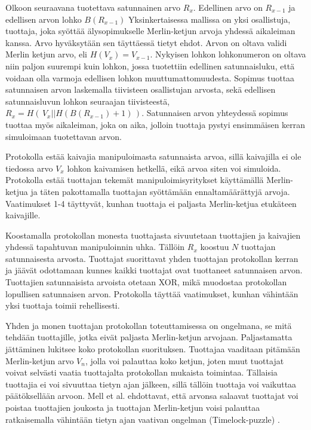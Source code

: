 Olkoon seuraavana tuotettava satunnainen arvo $R_x$. Edellinen arvo on $R_{x-1}$ ja edellisen arvon lohko $B(R_{x-1})$
Yksinkertaisessa mallissa on yksi osallistuja, tuottaja, joka syöttää älysopimukselle Merlin-ketjun arvoja yhdessä aikaleiman kanssa. Arvo hyväksytään sen täyttäessä tietyt ehdot. Arvon on oltava validi Merlin ketjun arvo, eli $H(V_x) = V_{x-1}$. Nykyisen lohkon lohkonumeron on oltava niin paljon suurempi kuin lohkon, jossa tuotettiin edellinen satunnaisluku, että voidaan olla varmoja edellisen lohkon muuttumattomuudesta. Sopimus tuottaa satunnaisen arvon laskemalla tiivisteen osallistujan arvosta, sekä edellisen satunnaisluvun lohkon seuraajan tiivisteestä, $R_x = H(\, V_x || H(B(R_{x-1})+1) \,)$. Satunnaisen arvon yhteydessä sopimus tuottaa myös aikaleiman, joka on aika, jolloin tuottaja pystyi ensimmäisen kerran simuloimaan tuotettavan arvon. 

Protokolla estää kaivajia manipuloimasta satunnaista arvoa, sillä kaivajilla ei ole tiedossa arvo $V_x$ lohkon kaivamisen hetkellä, eikä arvoa siten voi simuloida. Protokolla estää tuottajan tekemät manipuloimisyritykset käyttämällä Merlin-ketjua ja täten pakottamalla tuottajan syöttämään ennaltamäärättyjä arvoja. Vaatimukset 1-4 täyttyvät, kunhan tuottaja ei paljasta Merlin-ketjua etukäteen kaivajille. 

Koostamalla protokollan monesta tuottajasta sivuutetaan tuottajien ja kaivajien yhdessä tapahtuvan manipuloinnin uhka. Tällöin $R_x$ koostuu $N$ tuottajan satunnaisesta arvosta. Tuottajat suorittavat yhden tuottajan protokollan kerran ja jäävät odottamaan kunnes kaikki tuottajat ovat tuottaneet satunnaisen arvon. Tuottajien satunnaisista arvoista otetaan XOR, mikä muodostaa protokollan lopullisen satunnaisen arvon. Protokolla täyttää vaatimukset, kunhan vähintään yksi tuottaja toimii rehellisesti.

Yhden ja monen tuottajan protokollan toteuttamisessa on ongelmana, se mitä tehdään tuottajille, jotka eivät paljasta Merlin-ketjun arvojaan. Paljastamatta jättäminen lukitsee koko protokollan suorituksen. Tuottajaa vaaditaan pitämään Merlin-ketjun arvo $V_n$, jolla voi palauttaa koko ketjun, joten muut tuottajat voivat selvästi vaatia tuottajalta protokollan mukaista toimintaa. Tällaisia tuottajia ei voi sivuuttaa tietyn ajan jälkeen, sillä tällöin tuottaja voi vaikuttaa päätöksellään arvoon. Mell et al. ehdottavat, että arvonsa salaavat tuottajat voi poistaa tuottajien joukosta ja tuottajan Merlin-ketjun voisi palauttaa ratkaisemalla vähintään tietyn ajan vaativan ongelman (Timelock-puzzle) \cite{MerlinChains}. 

